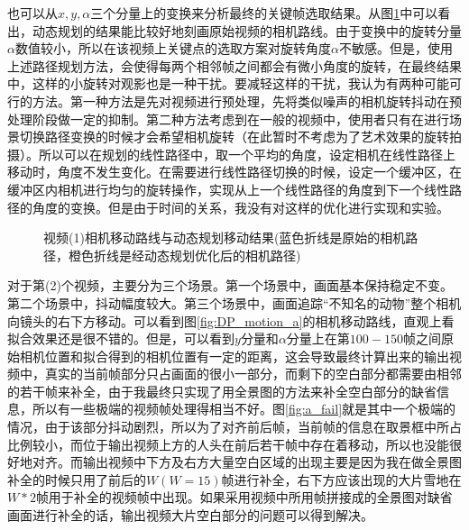 \documentclass[journal, a4paper]{IEEEtran}
\begin{document}
    也可以从$x,y,\alpha$三个分量上的变换来分析最终的关键帧选取结果。从图\ref{fig:DP_motion_c}中可以看出，动态规划的结果能比较好地刻画原始视频的相机路线。由于变换中的旋转分量$\alpha$数值较小，所以在该视频上关键点的选取方案对旋转角度$\alpha$不敏感。但是，使用上述路径规划方法，会使得每两个相邻帧之间都会有微小角度的旋转，在最终结果中，这样的小旋转对观影也是一种干扰。要减轻这样的干扰，我认为有两种可能可行的方法。第一种方法是先对视频进行预处理，先将类似噪声的相机旋转抖动在预处理阶段做一定的抑制。第二种方法考虑到在一般的视频中，使用者只有在进行场景切换路径变换的时候才会希望相机旋转（在此暂时不考虑为了艺术效果的旋转拍摄）。所以可以在规划的线性路径中，取一个平均的角度，设定相机在线性路径上移动时，角度不发生变化。在需要进行线性路径切换的时候，设定一个缓冲区，在缓冲区内相机进行均匀的旋转操作，实现从上一个线性路径的角度到下一个线性路径的角度的变换。但是由于时间的关系，我没有对这样的优化进行实现和实验。\\
    \begin{figure}[!hbt]
      \begin{center}
          \caption{视频(1)相机移动路线与动态规划移动结果(蓝色折线是原始的相机路径，橙色折线是经动态规划优化后的相机路径)}
          \label{fig:DP_motion_c}
      \end{center}
    \end{figure}
    
    对于第(2)个视频，主要分为三个场景。第一个场景中，画面基本保持稳定不变。第二个场景中，抖动幅度较大。第三个场景中，画面追踪“不知名的动物”整个相机向镜头的右下方移动。可以看到图\ref{fig:DP_motion_a}的相机移动路线，直观上看拟合效果还是很不错的。但是，可以看到$y$分量和$\alpha$分量上在第$100-150$帧之间原始相机位置和拟合得到的相机位置有一定的距离，这会导致最终计算出来的输出视频中，真实的当前帧部分只占画面的很小一部分，而剩下的空白部分都需要由相邻的若干帧来补全，由于我最终只实现了用全景图的方法来补全空白部分的缺省信息，所以有一些极端的视频帧处理得相当不好。图\ref{fig:a_fail}就是其中一个极端的情况，由于该部分抖动剧烈，所以为了对齐前后帧，当前帧的信息在取景框中所占比例较小，而位于输出视频上方的人头在前后若干帧中存在着移动，所以也没能很好地对齐。而输出视频中下方及右方大量空白区域的出现主要是因为我在做全景图补全的时候只用了前后的$W(W=15)$帧进行补全，右下方应该出现的大片雪地在$W*2$帧用于补全的视频帧中出现。如果采用视频中所用帧拼接成的全景图对缺省画面进行补全的话，输出视频大片空白部分的问题可以得到解决。\\
    
\end{document}

